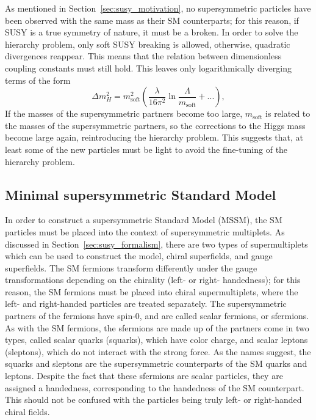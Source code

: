As mentioned in Section~\ref{sec:susy_motivation}, no supersymmetric particles
have been observed with the same mass as their SM counterparts; for this
reason, if SUSY is a true symmetry of nature, it must be a broken.
In order to solve the hierarchy problem, only soft SUSY breaking is allowed,
otherwise, quadratic divergences reappear.
This means that the relation between dimensionless coupling constants must
still hold.
This leaves only logarithmically diverging terms of the form
\begin{equation}
  \Delta m_{H}^2 =
  m_\mathrm{soft}^2
  \left(
    \frac{\lambda}{16\pi^2}
    \ln \frac{\Lambda}{m_\mathrm{soft}}
    + ...
  \right),
\end{equation}
If the masses of the supersymmetric partners become too large,
$m_\mathrm{soft}$ is related to the masses of the supersymmetric partners, so
the corrections to the Higgs mass become large again, reintroducing the
hierarchy problem.
This suggests that, at least some of the new particles must be light to avoid
the fine-tuning of the hierarchy problem.

\FloatBarrier
\subsection{Minimal supersymmetric Standard Model}
\label{sec:mssm}

In order to construct a supersymmetric Standard Model (MSSM), the SM particles
must be placed into the context of supersymmetric multiplets.
As discussed in Section~\ref{sec:susy_formalism}, there are two types of
supermultiplets which can be used to construct the model, chiral superfields,
and gauge superfields.
The SM fermions transform differently under the gauge transformations depending
on the chirality (left- or right- handedness); for this reason, the SM fermions
must be placed into chiral supermultiplets, where the left- and right-handed
particles are treated separately.
The supersymmetric partners of the fermions have spin-0, and are called
scalar fermions, or sfermions.
As with the SM fermions, the sfermions are made up of the partners come in
two types, called scalar quarks (squarks), which have color charge, and scalar
leptons (sleptons), which do not interact with the strong force.
As the names suggest, the squarks and sleptons are the supersymmetric
counterparts of the SM quarks and leptons.
Despite the fact that these sfermions are scalar particles, they are assigned
a handedness, corresponding to the handedness of the SM counterpart.
This should not be confused with the particles being truly left- or
right-handed chiral fields.

